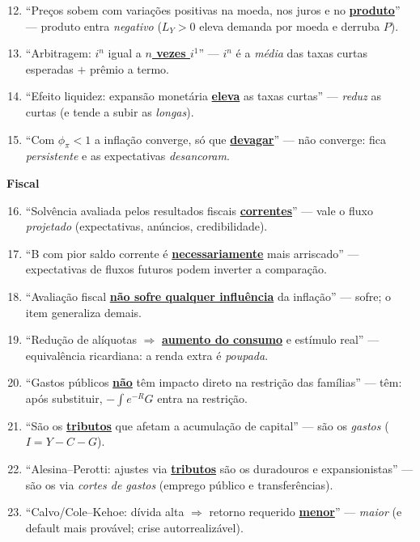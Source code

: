 \documentclass[12pt, a4paper]{article}
\newcommand{\mata}[1]{\textcolor{redf}{\underline{\textbf{#1}}}}
\begin{document}
\begin{falsebox}[title={Se aparecer parecido com isto, é F --- o erro está sublinhado}]
\begin{enumerate}[leftmargin=1.6em, itemsep=0.15em, topsep=0.2em]
\setcounter{enumi}{11}
\item ``Preços sobem com variações positivas na moeda, nos juros e no
\mata{produto}'' --- produto entra \emph{negativo} ($L_Y>0$ eleva demanda por
moeda e derruba $P$).
\item ``Arbitragem: $i^n$ igual a \mata{$n$ vezes $i^1$}'' --- $i^n$ é a
\emph{média} das taxas curtas esperadas $+$ prêmio a termo.
\item ``Efeito liquidez: expansão monetária \mata{eleva} as taxas curtas'' ---
\emph{reduz} as curtas (e tende a subir as \emph{longas}).
\item ``Com $\phi_\pi < 1$ a inflação converge, só que \mata{devagar}'' ---
não converge: fica \emph{persistente} e as expectativas \emph{desancoram}.
\end{enumerate}
\textbf{Fiscal}
\begin{enumerate}[leftmargin=1.6em, itemsep=0.15em, topsep=0.2em]
\setcounter{enumi}{15}
\item ``Solvência avaliada pelos resultados fiscais \mata{correntes}'' ---
vale o fluxo \emph{projetado} (expectativas, anúncios, credibilidade).
\item ``B com pior saldo corrente é \mata{necessariamente} mais arriscado''
--- expectativas de fluxos futuros podem inverter a comparação.
\item ``Avaliação fiscal \mata{não sofre qualquer influência} da inflação''
--- sofre; o item generaliza demais.
\item ``Redução de alíquotas $\Rightarrow$ \mata{aumento do consumo} e
estímulo real'' --- equivalência ricardiana: a renda extra é \emph{poupada}.
\item ``Gastos públicos \mata{não} têm impacto direto na restrição das
famílias'' --- têm: após substituir, $-\int e^{-R}G$ entra na restrição.
\item ``São os \mata{tributos} que afetam a acumulação de capital'' --- são os
\emph{gastos} ($I = Y - C - G$).
\item ``Alesina--Perotti: ajustes via \mata{tributos} são os duradouros e
expansionistas'' --- são os via \emph{cortes de gastos} (emprego público e
transferências).
\item ``Calvo/Cole--Kehoe: dívida alta $\Rightarrow$ retorno requerido
\mata{menor}'' --- \emph{maior} (e default mais provável; crise
autorrealizável).
\end{enumerate}
\end{falsebox}
\end{document}
